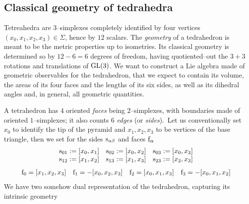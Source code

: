 

\subsection{Classical geometry of tedrahedra}


Tetreahedra are $3$--simplexes completely identified by four vertices $(x_0,x_1,x_2,x_3)\in\Sigma$, hence by $12$ scalars. The \emph{geometry} of a tedrahedron is meant to be the metric properties up to isometries. Its classical geometry is determined so by $12-6=6$ degrees of freedom, having quotiented--out the $3+3$ rotations and translations of $\text{\normalfont GL}(3)$. We want to construct a Lie algebra made of geometric observables for the tedrahedron, that we expect to contain its volume, the areas of its four faces and the lengths of its six sides, as well as its dihedral angles and, in general, all geometric quantities.

A tetrahedron has $4$ oriented \emph{faces} being $2$--simplexes, with boundaries made of oriented $1$--simplexes; it also counts $6$ \emph{edges} (or \emph{sides}).\, Let us conventionally set $x_0$ to identify the tip of the pyramid and $x_1,x_2,x_3$ to be vertices of the base triangle, then we set for the sides $\text{\normalfont s}_{\alpha\beta}$ and faces $\text{\normalfont f}_\alpha$
$$\begin{matrix}
    \text{\normalfont s}_{01}:=[x_0,x_1] & \text{\normalfont s}_{02}:=[x_0,x_2] & \text{\normalfont s}_{03}:=[x_0,x_3]\\
    \text{\normalfont s}_{12}:=[x_1,x_2] & \text{\normalfont s}_{13}:=[x_1,x_3] & \text{\normalfont s}_{23}:=[x_2,x_3]
\end{matrix}$$
$$\begin{matrix}
    \text{\normalfont f}_0=[x_1,x_2,x_3] & \text{\normalfont f}_1=-[x_0,x_2,x_3] &\text{\normalfont f}_2=[x_0,x_1,x_3] &\text{\normalfont f}_3=-[x_0,x_1,x_2]
\end{matrix}$$
We have two somehow dual representation of the tedrahedron, capturing its intrinsic geometry

